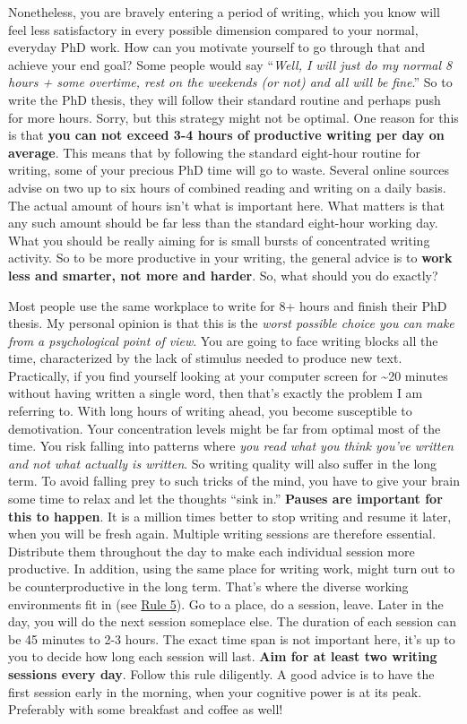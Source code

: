 \documentclass[
  12pt,
  oneside]{book}
\begin{document}
Nonetheless, you are bravely entering a period of writing, which you know will feel less satisfactory in every possible dimension compared to your normal, everyday PhD work.
How can you motivate yourself to go through that and achieve your end goal?
Some people would say ``\emph{Well, I will just do my normal 8 hours + some overtime, rest on the weekends (or not) and all will be fine}.''
So to write the PhD thesis, they will follow their standard routine and perhaps push for more hours.
Sorry, but this strategy might not be optimal.
One reason for this is that \textbf{you can not exceed 3-4 hours of productive writing per day on average}.
This means that by following the standard eight-hour routine for writing, some of your precious PhD time will go to waste.
Several online sources advise on two up to six hours of combined reading and writing on a daily basis.
The actual amount of hours isn't what is important here.
What matters is that any such amount should be far less than the standard eight-hour working day.
What you should be really aiming for is small bursts of concentrated writing activity.
So to be more productive in your writing, the general advice is to \textbf{work less and smarter, not more and harder}.
So, what should you do exactly?

Most people use the same workplace to write for 8+ hours and finish their PhD thesis.
My personal opinion is that this is the \emph{worst possible choice you can make from a psychological point of view}.
You are going to face writing blocks all the time, characterized by the lack of stimulus needed to produce new text.
Practically, if you find yourself looking at your computer screen for \textasciitilde20 minutes without having written a single word, then that's exactly the problem I am referring to.
With long hours of writing ahead, you become susceptible to demotivation.
Your concentration levels might be far from optimal most of the time.
You risk falling into patterns where \emph{you read what you think you've written and not what actually is written}.
So writing quality will also suffer in the long term.
To avoid falling prey to such tricks of the mind, you have to give your brain some time to relax and let the thoughts ``sink in.''
\textbf{Pauses are important for this to happen}.
It is a million times better to stop writing and resume it later, when you will be fresh again.
Multiple writing sessions are therefore essential.
Distribute them throughout the day to make each individual session more productive.
In addition, using the same place for writing work, might turn out to be counterproductive in the long term.
That's where the diverse working environments fit in (see \protect\hyperlink{rule5}{Rule 5}).
Go to a place, do a session, leave.
Later in the day, you will do the next session someplace else.
The duration of each session can be 45 minutes to 2-3 hours.
The exact time span is not important here, it's up to you to decide how long each session will last.
\textbf{Aim for at least two writing sessions every day}.
Follow this rule diligently.
A good advice is to have the first session early in the morning, when your cognitive power is at its peak.
Preferably with some breakfast and coffee as well!
\end{document}
